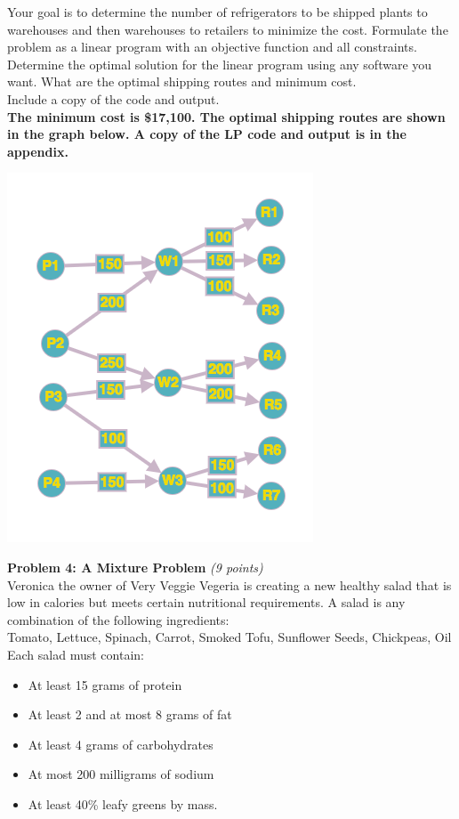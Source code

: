 \documentclass{article}
\begin{document}
\noindent Your goal is to determine the number of refrigerators to be shipped plants to warehouses and then warehouses to retailers to minimize the cost. Formulate the problem as a linear program with an objective function and all constraints. Determine the optimal solution for the linear program using any software you want. What are the optimal shipping routes and minimum cost.\\
Include a copy of the code and output.
\\[.25cm]
\textbf{The minimum cost is \$17,100. The optimal shipping routes are shown in the graph below. A copy of the LP code and output is in the appendix.}

\includegraphics[scale=.5]{TRANS1}\\

\newpage

\noindent \textbf{Problem 4: A Mixture Problem} \textit{(9 points)}\\ 
Veronica the owner of Very Veggie Vegeria is creating a new healthy salad that is low in calories but meets certain nutritional requirements. A salad is any combination of the following ingredients:\\
\indent Tomato, Lettuce, Spinach, Carrot, Smoked Tofu, Sunflower Seeds, Chickpeas, Oil
\\
Each salad must contain:
\begin{itemize}
    \item At least 15 grams of protein
    \item At least 2 and at most 8 grams of fat
    \item At least 4 grams of carbohydrates
    \item At most 200 milligrams of sodium
    \item At least 40\% leafy greens by mass.
\end{itemize}
\end{document}
